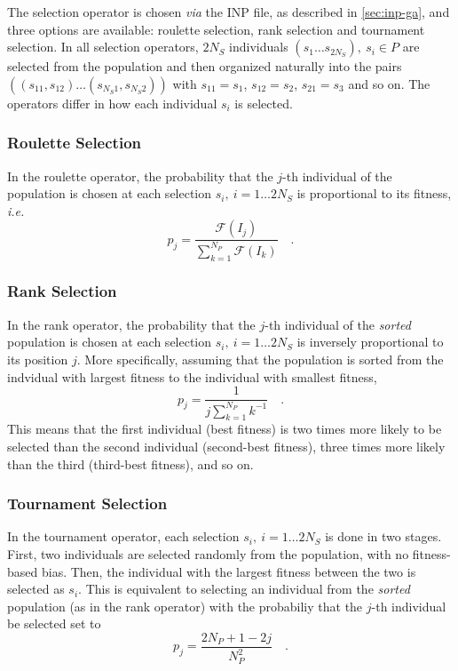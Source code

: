 \documentclass[10pt,a4paper,openany]{memoir}
\numberwithin{equation}{section}
\begin{document}
The selection operator is chosen \textit{via} the INP file, as described in \autoref{sec:inp-ga}, and three options are available: roulette selection, rank selection and tournament selection.
In all selection operators, $2N_S$ individuals
$(s_1\ldots s_{2N_S}),\ s_i \in P$ are selected from the population and then
organized naturally into the pairs
$((s_{11},s_{12})\ldots (s_{N_S 1},s_{N_S 2}))$ with $s_{11}=s_{1}$,
$s_{12}=s_{2}$, $s_{21}=s_{3}$ and so on. The operators differ in how each
individual $s_i$ is selected.

\subsubsection{Roulette Selection}
\label{sec:ga-selection-roulette}

In the roulette operator, the probability that the
$j$-th individual of the population is chosen at each selection $s_i,\ i=1\ldots 2N_S$ is
proportional to its fitness, \textit{i.e.}
\begin{equation}
  \label{eq:ga-sel-roulette}
  p_j = \frac{\mathcal{F}(I_j)}{\sum_{k=1}^{N_P} \mathcal{F}(I_k)} \quad .
\end{equation}

\subsubsection{Rank Selection}
\label{sec:ga-selection-rank}

In the rank operator, the probability that the $j$-th individual of the
\textit{sorted} population is chosen at each selection $s_i,\ i=1\ldots 2N_S$ 
is inversely proportional to its position $j$. More specifically, assuming that
the population is sorted from the indvidual with largest fitness to the
individual with smallest fitness,
\begin{equation}
  \label{eq:ga-sel-rank}
  p_j = \frac{1}{j\sum_{k=1}^{N_P} k^{-1}} \quad .
\end{equation}
This means that the first individual (best fitness) is two times more likely to
be selected than the second individual (second-best fitness), three times more
likely than the third (third-best fitness), and so on.

\subsubsection{Tournament Selection}
\label{sec:ga-selection-tournament}

In the tournament operator, each selection $s_i,\ i=1\ldots 2N_S$ is done in two
stages.  First, two individuals are selected randomly from the population, with
no fitness-based bias.  Then, the individual with the largest fitness between the
two is selected as $s_i$.  This is equivalent to selecting an individual from the
\textit{sorted} population (as in the rank operator) with the probabiliy that the
$j$-th individual be selected set to 
\begin{equation}
  \label{eq:ga-sel-tournamnt}
  p_j = \frac{2N_P + 1 - 2j}{N_P^2} \quad .
\end{equation}
\end{document}

